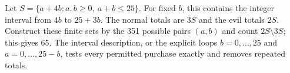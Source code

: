 Let $S=\{a+4b:a,b\ge0,\ a+b\le25\}$. For fixed $b$, this contains the integer interval from $4b$ to $25+3b$. The normal totals are $3S$ and the evil totals $2S$. Construct these finite sets by the 351 possible pairs $(a,b)$ and count $2S\setminus3S$; this gives $\boxed{65}$. The interval description, or the explicit loops $b=0,\ldots,25$ and $a=0,\ldots,25-b$, tests every permitted purchase exactly and removes repeated totals.
